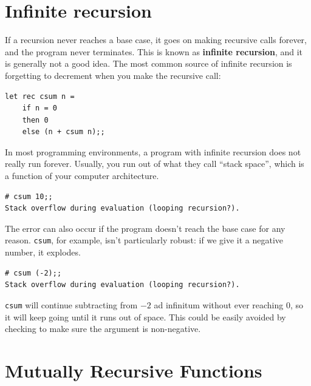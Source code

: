 \documentclass[10pt]{book}
\begin{document}

\section{Infinite recursion}

If a recursion never reaches a base case, it goes on making
recursive calls forever, and the program never terminates.  This is
known as {\bf infinite recursion}, and it is generally not
a good idea.  The most common source of infinite recursion
is forgetting to decrement when you make the recursive call:

\beforeverb
\begin{verbatim}
let rec csum n = 
	if n = 0
	then 0
	else (n + csum n);;\end{verbatim}
\afterverb
%
In most programming environments, a program with infinite recursion
does not really run forever. Usually, you run out of what they call
``stack space'', which is a function of your computer architecture.


\beforeverb
\begin{verbatim}
# csum 10;;
Stack overflow during evaluation (looping recursion?).
\end{verbatim}
\afterverb

The error can also occur if the program doesn't reach the base case
for any reason. {\tt csum}, for example, isn't particularly robust:
if we give it a negative number, it explodes.

\beforeverb
\begin{verbatim}
# csum (-2);;
Stack overflow during evaluation (looping recursion?).
\end{verbatim}
\afterverb

{\tt csum} will continue subtracting from $-2$ ad infinitum without 
ever reaching 0, so it will keep going until it runs out of space.
This could be easily avoided by checking to make sure the argument 
is non-negative.

\section{Mutually Recursive Functions}
\end{document}
